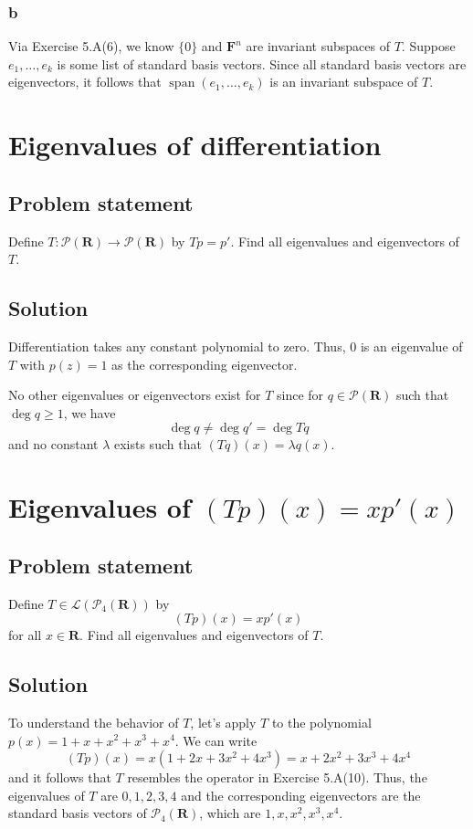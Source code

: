 \documentclass{article}
\begin{document}
\subsubsection*{b}
Via Exercise 5.A(6), we know $\{0\}$ and $\mathbf{F}^n$ are invariant subspaces of $T$. 
Suppose $e_1,\ldots,e_k$ is some list of standard basis vectors. 
Since all standard basis vectors are eigenvectors, it follows that $\operatorname{span}(e_1,\ldots,e_k)$ is an invariant subspace of $T$.

\clearpage

\section{Eigenvalues of differentiation}
\subsection*{Problem statement}
Define $T:\mathcal{P}(\mathbf{R})\rightarrow\mathcal{P}(\mathbf{R})$ by $Tp=p'$. 
Find all eigenvalues and eigenvectors of $T$.

\subsection*{Solution}
Differentiation takes any constant polynomial to zero. 
Thus, $0$ is an eigenvalue of $T$ with $p(z)=1$ as the corresponding eigenvector. 

No other eigenvalues or eigenvectors exist for $T$ since for $q\in\mathcal{P}(\mathbf{R})$ such that $\deg q\geq 1$, we have 
\[\deg q\neq \deg q'= \deg Tq\]
and no constant $\lambda$ exists such that $(Tq)(x)=\lambda q(x)$.

\clearpage

\section{Eigenvalues of $(Tp)(x)=xp'(x)$}
\subsection*{Problem statement}
Define $T\in\mathcal{L}(\mathcal{P}_4(\mathbf{R}))$ by
\[(Tp)(x)=xp'(x)\]
for all $x\in\mathbf{R}$. 
Find all eigenvalues and eigenvectors of $T$.

\subsection*{Solution}
To understand the behavior of $T$, let's apply $T$ to the polynomial\newline $p(x)=1+x+x^2+x^3+x^4$. We can write
\[(Tp)(x)=x(1+2x+3x^2+4x^3)=x+2x^2+3x^3+4x^4\]
and it follows that $T$ resembles the operator in Exercise 5.A(10). 
Thus, the eigenvalues of $T$ are $0,1,2,3,4$ and the corresponding eigenvectors are the standard basis vectors of $\mathcal{P}_4(\mathbf{R})$, which are $1,x,x^2,x^3,x^4$.
\end{document}
